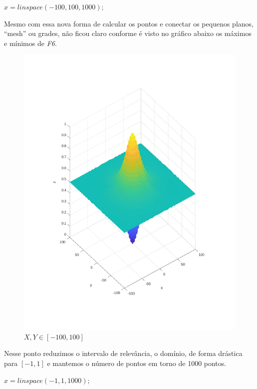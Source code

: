 \documentclass{article}
\begin{document}
$x = linspace(-100, 100, 1000);$



\newpage
Mesmo com essa nova forma de calcular os pontos e conectar os pequenos planos, ``mesh'' ou grades, não ficou claro conforme é visto no gráfico abaixo os máximos e mínimos de \emph{F6}.

\begin{figure}[h!]
\centering
\includegraphics[scale=.5]{images/myplot3.pdf}
\caption{$X,Y \in [-100, 100]$}
\label{fig:plot3_f6}
\end{figure}

Nesse ponto reduzimos o intervalo de relevância, o domínio, de forma drástica para $[-1,1]$ e mantemos o número de pontos em torno de 1000 pontos.

$x = linspace(-1, 1, 1000);$


\end{document}
